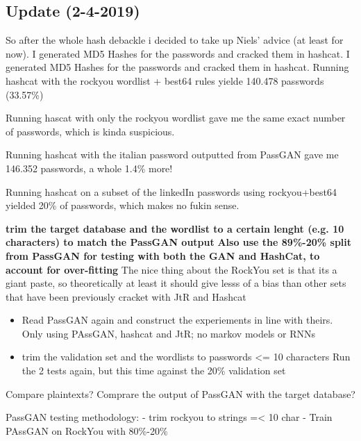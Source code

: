 \subsection{Update (2-4-2019)}

So after the whole hash debackle i decided to take up Niels' advice (at least for now). I generated MD5 Hashes for the passwords and cracked them in hashcat. I generated MD5 Hashes for the passwords and cracked them in hashcat.
Running hashcat with the rockyou wordlist + best64 rules yielde 140.478 passwords (33.57\%)

Running hascat with only the rockyou wordlist gave me the same exact number of passwords, which is kinda suspicious.

Running hashcat with the italian password outputted from PassGAN gave me 146.352 passwords, a whole 1.4\% more!

Running hashcat on a subset of the linkedIn passwords using rockyou+best64 yielded 20\% of passwords, which makes no fukin sense.

\textbf{trim the target database and the wordlist to a certain lenght (e.g. 10 characters) to match the PassGAN output}
\textbf{Also use the 89\%-20\% split from PassGAN for testing with both the GAN and HashCat, to account for over-fitting}
The nice thing about the RockYou set is that its a giant paste, so theoretically at least it should give lesss of a bias than other sets that have been previously cracket with JtR and Hashcat 

\begin{itemize}
\item Read PassGAN again and construct the experiements in line with theirs.
    \subitem Only using PAssGAN, hashcat and JtR; no markov models or RNNs

\item trim the validation set and the wordlists to passwords <= 10 characters    
\subitem Run the 2 tests again, but this time against the 20\% validation set
\end{itemize}

Compare plaintexts?
Comprare the output of PassGAN with the target database?

PassGAN testing methodology:
- trim rockyou to strings =< 10 char
- Train PAssGAN on RockYou with 80\%-20\%

